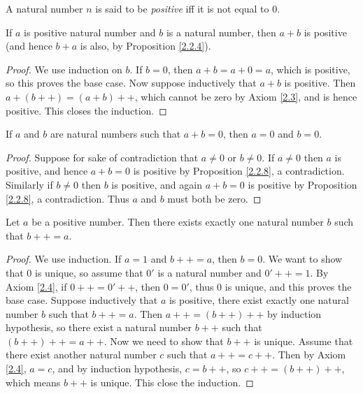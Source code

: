 \begin{definition}\label{2.2.7}
A natural number \(n\) is said to be \emph{positive} iff it is not equal to \(0\).
\end{definition}

\begin{proposition}\label{2.2.8}
If \(a\) is positive natural number and \(b\) is a natural number, then \(a + b\) is positive (and hence \(b + a\) is also, by Proposition \ref{2.2.4}).
\end{proposition}

\begin{proof}
We use induction on \(b\).
If \(b = 0\), then \(a + b = a + 0 = a\), which is positive, so this proves the base case.
Now suppose inductively that \(a + b\) is positive.
Then \(a + (b++) = (a + b)++\), which cannot be zero by Axiom \ref{2.3}, and is hence positive.
This closes the induction.
\end{proof}

\begin{corollary}\label{2.2.9}
If \(a\) and \(b\) are natural numbers such that \(a + b = 0\), then \(a = 0\) and \(b = 0\).
\end{corollary}

\begin{proof}
Suppose for sake of contradiction that \(a \neq 0\) or \(b \neq 0\).
If \(a \neq 0\) then \(a\) is positive, and hence \(a + b = 0\) is positive by Proposition \ref{2.2.8}, a contradiction.
Similarly if \(b \neq 0\) then \(b\) is positive, and again \(a + b = 0\) is positive by Proposition \ref{2.2.8}, a contradiction.
Thus \(a\) and \(b\) must both be zero.
\end{proof}

\begin{lemma}\label{2.2.10}
Let \(a\) be a positive number.
Then there exists exactly one natural number \(b\) such that \(b++ = a\).
\end{lemma}

\begin{proof}
We use induction.
If \(a = 1\) and \(b++ = a\), then \(b = 0\).
We want to show that \(0\) is unique, so assume that \(0'\) is a natural number and \(0'++ = 1\).
By Axiom \ref{2.4}, if \(0++ = 0'++\), then \(0 = 0'\), thus \(0\) is unique, and this proves the base case.
Suppose inductively that \(a\) is positive, there exist exactly one natural number \(b\) such that \(b++ = a\).
Then \(a++ = (b++)++\) by induction hypothesis, so there exist a natural number \(b++\) such that \((b++)++ = a++\).
Now we need to show that \(b++\) is unique.
Assume that there exist another natural number \(c\) such that \(a++ = c++\).
Then by Axiom \ref{2.4}, \(a = c\), and by induction hypothesis, \(c = b++\), so \(c++ = (b++)++\), which means \(b++\) is unique.
This close the induction.
\end{proof}

